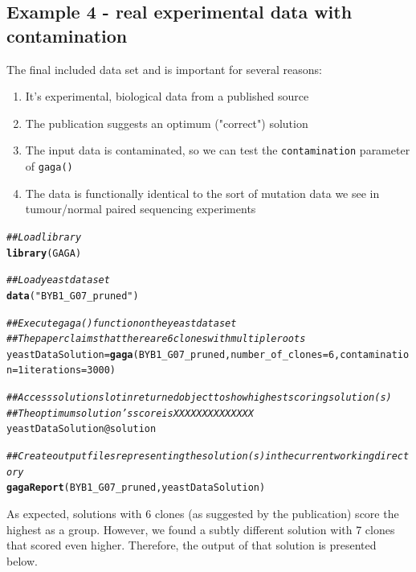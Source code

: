 \documentclass[a4paper]{article}\usepackage[]{graphicx}\usepackage[]{color}
\makeatletter
\newcommand{\hlstr}[1]{\textcolor[rgb]{0.192,0.494,0.8}{#1}}%
\newcommand{\hlcom}[1]{\textcolor[rgb]{0.678,0.584,0.686}{\textit{#1}}}%
\newcommand{\hlkwd}[1]{\textcolor[rgb]{0.737,0.353,0.396}{\textbf{#1}}}%
\newenvironment{kframe}{%
 \def\at@end@of@kframe{}%
 \ifinner\ifhmode%
  \def\at@end@of@kframe{\end{minipage}}%
  \begin{minipage}{\columnwidth}%
 \fi\fi%
 \def\FrameCommand##1{\hskip\@totalleftmargin \hskip-\fboxsep
 \colorbox{shadecolor}{##1}\hskip-\fboxsep
     \hskip-\linewidth \hskip-\@totalleftmargin \hskip\columnwidth}%
 \MakeFramed {\advance\hsize-\width
   \@totalleftmargin\z@ \linewidth\hsize
   \@setminipage}}%
 {\par\unskip\endMakeFramed%
 \at@end@of@kframe}
\newenvironment{knitrout}{}{} %
\makeatother
\begin{document}
\subsection{Example 4 - real experimental data with contamination}
The final included data set and is important for several reasons:

\begin{enumerate}
   \item It's experimental, biological data from a published source \cite{yeast}
   \item The publication suggests an optimum ("correct") solution
   \item The input data is contaminated, so we can test the \texttt{contamination} parameter of \texttt{gaga()} 
   \item The data is functionally identical to the sort of mutation data we see in tumour/normal paired sequencing experiments
\end{enumerate}

\begin{knitrout}
\color{fgcolor}\begin{kframe}
\begin{alltt}
\hlcom{## Load library}
\hlkwd{library}(GAGA)

\hlcom{## Load yeast data set}
\hlkwd{data}(\hlstr{"BYB1_G07_pruned"})

\hlcom{## Execute gaga() function on the yeast data set}
\hlcom{## The paper claims that there are 6 clones with multiple roots}
yeastDataSolution=\hlkwd{gaga}(BYB1_G07_pruned, number_of_clones=6, contamination=1 iterations=3000)

\hlcom{## Access solution slot in returned object to show highest scoring solution(s)}
\hlcom{## The optimum solution's score is XXXXXXXXXXXXXX}
yeastDataSolution@solution

\hlcom{## Create output files representing the solution(s) in the current working directory}
\hlkwd{gagaReport}(BYB1_G07_pruned,yeastDataSolution)
\end{alltt}
\end{kframe}
\end{knitrout}


As expected, solutions with 6 clones (as suggested by the publication) score the highest as a group.  However, we found a subtly
different solution with 7 clones that scored even higher.  Therefore, the output of that solution is presented below.
\end{document}
